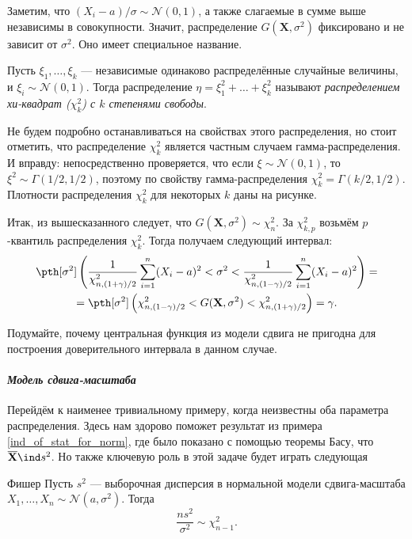 Заметим, что $(X_i - a) / \sigma \sim \mathcal{N}(0, 1)$, а также слагаемые в сумме выше независимы в совокупности. Значит, распределение $G(\mathbf X, \sigma^2)$ фиксировано и не зависит от $\sigma^2$. Оно имеет специальное название.

\begin{definition}
    Пусть $\xi_1, \ldots, \xi_k$ --- независимые одинаково распределённые случайные величины, и $\xi_i \sim \mathcal{N}(0, 1)$. Тогда распределение $\eta = \xi_1^2 + \ldots + \xi_k^2$ называют \textit{распределением хи-квадрат ($\chi^2_k$) с $k$ степенями свободы}.
\end{definition}

Не будем подробно останавливаться на свойствах этого распределения, но стоит отметить, что распределение $\chi^2_k$ является частным случаем гамма-распределения. И вправду: непосредственно проверяется, что если $\xi \sim \mathcal{N}(0, 1)$, то $\xi^2 \sim \Gamma(1/2, 1/2)$, поэтому по свойству гамма-распределения $\chi^2_k = \Gamma(k/2, 1/2)$. Плотности распределения $\chi^2_k$ для некоторых $k$ даны на рисунке.

Итак, из вышесказанного следует, что $G(\mathbf X, \sigma^2) \sim \chi^2_{n}$. За $\chi^2_{k,p}$ возьмём $p$-квантиль распределения $\chi^2_{k}$. Тогда получаем следующий интервал:
\begin{gather*}
    \pth[\sigma^2]\left(\frac{1}{\chi^2_{n,(1+\gamma)/2}}\sum_{i=1}^n (X_i - a)^2 < \sigma^2 < \frac{1}{\chi^2_{n,(1-\gamma)/2}}\sum_{i=1}^n (X_i - a)^2\right) = \\
    = \pth[\sigma^2]\left(\chi^2_{n,(1-\gamma)/2} < G(\mathbf X, \sigma^2) < \chi^2_{n,(1+\gamma)/2}\right) = \gamma.
\end{gather*}

\begin{remark}
    Подумайте, почему центральная функция из модели сдвига не пригодна для построения доверительного интервала в данном случае.
\end{remark}

\paragraph{\textit{Модель сдвига-масштаба}}
Перейдём к наименее тривиальному примеру, когда неизвестны оба параметра распределения. Здесь нам здорово поможет результат из примера \ref{ind_of_stat_for_norm}, где было показано с помощью теоремы Басу, что $\overline{\mathbf X} \ind s^2$. Но также ключевую роль в этой задаче будет играть следующая
\begin{theorem}[label=distr_of_var]{Фишер}{}
    Пусть $s^2$ --- выборочная дисперсия в нормальной модели сдвига-масштаба $X_1, \ldots, X_n \sim \mathcal{N}(a, \sigma^2)$. Тогда
    \[
    \frac{ns^2}{\sigma^2} \sim \chi^2_{n-1}.
    \]
\end{theorem}

